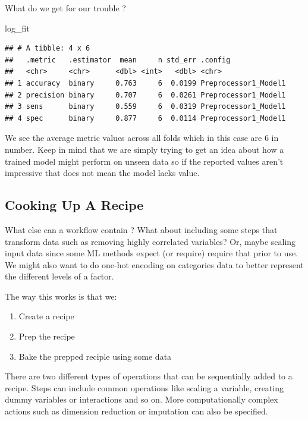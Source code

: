 \documentclass[
]{article}
\newenvironment{Shaded}{\begin{snugshade}}{\end{snugshade}}
\newcommand{\NormalTok}[1]{#1}
\providecommand{\tightlist}{%
  \setlength{\itemsep}{0pt}\setlength{\parskip}{0pt}}
\begin{document}
What do we get for our trouble ?

\begin{Shaded}
\begin{Highlighting}[]
\NormalTok{log\_fit}
\end{Highlighting}
\end{Shaded}

\begin{verbatim}
## # A tibble: 4 x 6
##   .metric   .estimator  mean     n std_err .config             
##   <chr>     <chr>      <dbl> <int>   <dbl> <chr>               
## 1 accuracy  binary     0.763     6  0.0199 Preprocessor1_Model1
## 2 precision binary     0.707     6  0.0261 Preprocessor1_Model1
## 3 sens      binary     0.559     6  0.0319 Preprocessor1_Model1
## 4 spec      binary     0.877     6  0.0114 Preprocessor1_Model1
\end{verbatim}

We see the average metric values across all folds which in this case are
6 in number. Keep in mind that we are simply trying to get an idea about
how a trained model might perform on unseen data so if the reported
values aren't impressive that does not mean the model lacks value.

\hypertarget{cooking-up-a-recipe}{%
\subsection{Cooking Up A Recipe}\label{cooking-up-a-recipe}}

What else can a workflow contain ? What about including some steps that
transform data such as removing highly correlated variables? Or, maybe
scaling input data since some ML methods expect (or require) require
that prior to use. We might also want to do one-hot encoding on
categories data to better represent the different levels of a factor.

The way this works is that we:

\begin{enumerate}
\def\labelenumi{\arabic{enumi})}
\tightlist
\item
  Create a recipe
\item
  Prep the recipe
\item
  Bake the prepped reciple using some data
\end{enumerate}

There are two different types of operations that can be sequentially
added to a recipe. Steps can include common operations like scaling a
variable, creating dummy variables or interactions and so on. More
computationally complex actions such as dimension reduction or
imputation can also be specified.
\end{document}
